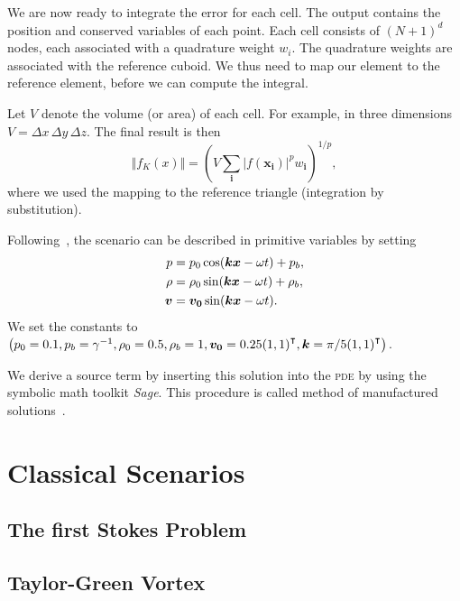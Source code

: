 We are now ready to integrate the error for each cell.
The output contains the position and conserved variables of each point.
Each cell consists of $(N + 1)^d$ nodes, each associated with a quadrature weight $w_i$.
The quadrature weights are associated with the reference cuboid.
We thus need to map our element to the reference element, before we can compute the integral.

Let $V$ denote the volume (or area) of each cell.
For example, in three dimensions $V = \Delta x \, \Delta y \, \Delta z$.
The final result is then
\begin{equation}
  \Vert f_K(x) \Vert = \left( V \sum_{\bm{i}} \vert f(\bm{x}_{\bm{i}}) \vert^p w_{{\bm{i}}}  \right)^{1/p},
\end{equation}
where we used the mapping to the reference triangle (integration by substitution).

Following~\cite{dumbser2010arbitrary}, the scenario can be described in primitive variables by setting
\begin{align}
  p &= p_0 \cos( \bm{k} \bm{x} - \omega t ) + p_b, \\
  \rho &= \rho_0 \sin (\bm{k} \bm{x} - \omega t) + \rho_b, \\
  \bm{v} &= \bm{v_0} \sin(\bm{k} \bm{x} - \omega t).
\end{align}
We set the constants to \( \left(  p_0 = 0.1, p_b = \gamma^{-1}, \rho_0 = 0.5, \rho_b = 1, 
\bm{v_0} = 0.25 {(1,1)}^\intercal, \bm{k} = \pi/5 {(1,1)}^\intercal \right) \).

We derive a source term by inserting this solution into the \textsc{pde} by using the symbolic math toolkit \textit{Sage}.
This procedure is called method of manufactured solutions~\cite{salari2000code}.

\section{Classical Scenarios}

\subsection{The first Stokes Problem}
\cite{dumbser2010arbitrary}
\subsection{Taylor-Green Vortex}
\cite{dumbser2016high}

